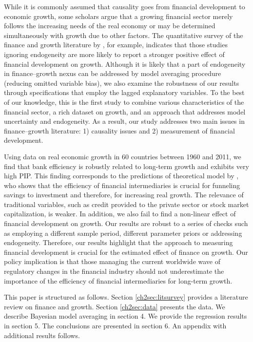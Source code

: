 While it is commonly assumed that causality goes from financial development to economic growth, some scholars argue that a growing financial sector merely follows the increasing needs of the real economy or may be determined simultaneously with growth due to other factors. The quantitative survey of the finance and growth literature by \citet{Valickovaetal2014}, for example, indicates that those studies ignoring endogeneity are more likely to report a stronger positive effect of financial development on growth. Although it is likely that a part of endogeneity in finance--growth nexus can be addressed by model averaging procedure (reducing omitted variable bias), we also examine the robustness of our results through specifications that employ the lagged explanatory variables. To the best of our knowledge, this is the first study to combine various characteristics of the financial sector, a rich dataset on growth, and an approach that addresses model uncertainty and endogeneity. As a result, our study addresses two main issues in finance--growth literature: 1) causality issues and 2) measurement of financial development.

Using data on real economic growth in 60 countries between 1960 and 2011, we find that bank efficiency is robustly related to long-term growth and exhibits very high \ac{PIP}. This finding corresponds to the predictions of theoretical model by \citet{Pagano1993}, who shows that the efficiency of financial intermediaries is crucial for funneling savings to investment and therefore, for increasing real growth. The relevance of traditional variables, such as credit provided to the private sector or stock market capitalization, is weaker. In addition, we also fail to find a non-linear effect of financial development on growth.  Our results are robust to a series of checks such as employing a different sample period, different parameter priors or addressing endogeneity. Therefore, our results highlight that the approach to measuring financial development is crucial for the estimated effect of finance on growth. Our policy implication is that those managing the current worldwide wave of regulatory changes in the financial industry should not underestimate the importance of the efficiency of financial intermediaries for long-term growth.

This paper is structured as follows. Section \ref{ch2sec:litsurvey} provides a literature review on finance and growth. Section \ref{ch2sec:data} presents the data. We describe Bayesian model averaging in section 4. We provide the regression results in section 5. The conclusions are presented in section 6. An appendix with additional results follows. 
%
%
% 
%
%
